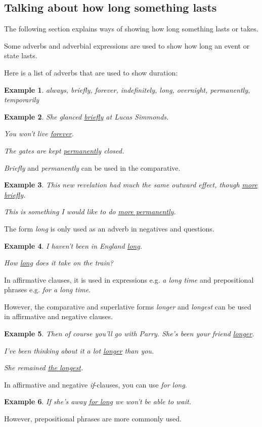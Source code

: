 \documentclass[oneside]{book}
\numberwithin{equation}{section}
\newtheorem{example}{Example}[section]
\begin{document}
\subsection{Talking about how long something lasts}
\noindent{} The following section explains ways of showing how long something lasts or takes.

%
Some adverbs and adverbial expressions are used to show how long an event or state lasts.

Here is a list of adverbs that are used to show duration:
\begin{example}
    always, briefly, forever, indefinitely, long, overnight, permanently, temporarily
\end{example}

\begin{example}
    She glanced \underline{briefly} at Lucas Simmonds.
    
    You won't live \underline{forever}.
    
    The gates are kept \underline{permanently} closed.
\end{example}
\textit{Briefly} and \textit{permanently} can be used in the comparative.
\begin{example}
    This new revelation had much the same outward effect, though \underline{more briefly}.
    
    This is something I would like to do \underline{more permanently}.
\end{example}
The form \textit{long} is only used as an adverb in negatives and questions.
\begin{example}
    I haven't been in England \underline{long}.
    
    How \underline{long} does it take on the train?
\end{example}
In affirmative clauses, it is used in expressions e.g. \textit{a long time} and prepositional phrases e.g. \textit{for a long time}.

However, the comparative and superlative forms \textit{longer} and \textit{longest} can be used in affirmative and negative clauses.
\begin{example}
    Then of course you'll go with Parry. She's been your friend \underline{longer}.
    
    I've been thinking about it a lot \underline{longer} than you.
    
    She remained \underline{the longest}.
\end{example}
In affirmative and negative \textit{if}-clauses, you can use \textit{for long}.
\begin{example}
    If she's away \underline{for long} we won't be able to wait.
\end{example}
%
\noindent{} However, prepositional phrases are more commonly used.
\end{document}
